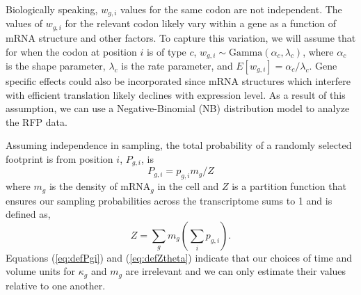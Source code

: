 \documentclass{article}
\newcommand{\waitTerm}{\ensuremath{w}\xspace}
\newcommand{\wgi}{\ensuremath{\waitTerm_{g,i}}\xspace}
\newcommand{\alphac}{\ensuremath{{\alpha_c}}\xspace}
\newcommand{\lambdac}{\ensuremath{{\lambda_c}}\xspace}
\newcommand{\pgi}{\ensuremath{{p_{g,i}}}\xspace}
\newcommand{\Pgi}{\ensuremath{{P_{g,i}}}\xspace}
\newcommand{\mg}{\ensuremath{{m_g}}\xspace}
\newcommand{\kappag}{\ensuremath{{\kappa_{g}}}\xspace}
\newcommand{\Ztheta}{\ensuremath{{Z}}\xspace}
\newcommand{\mRNAg}{mRNA$_g$\xspace}
\begin{document}
Biologically speaking, \wgi values for the same codon are not independent.
The values of \wgi for the relevant codon likely vary within a gene as a function of mRNA structure and other factors.
To capture this variation, we will assume that for when the codon at position $i$ is of type $c$, $\wgi \sim \text{Gamma}(\alphac, \lambdac)$, where \alphac is the shape parameter, \lambdac is the rate parameter, and $E[\wgi] = \alphac/\lambdac$. %
Gene specific effects could also be incorporated since  mRNA structures which interfere with efficient translation likely declines with expression level.
As a result of this assumption, we can use a Negative-Binomial (NB) distribution model to analyze the RFP data.


Assuming independence in sampling, the total probability of a randomly selected footprint is from position $i$, $\Pgi$, is
\begin{equation} \label{eq:defPgi}
\Pgi = \pgi \mg/\Ztheta 
\end{equation}
where \mg is the density of \mRNAg in the cell and \Ztheta is a partition function that ensures our sampling probabilities across the transcriptome sums to 1 and is defined as,
\begin{equation}
  \label{eq:defZtheta}
  \Ztheta = \sum_g \mg \left(\sum_i \pgi\right).
\end{equation}
Equations (\ref{eq:defPgi}) and (\ref{eq:defZtheta}) indicate that our choices of time and volume units for \kappag and \mg are irrelevant and we can only estimate their values relative to one another.

\end{document}
